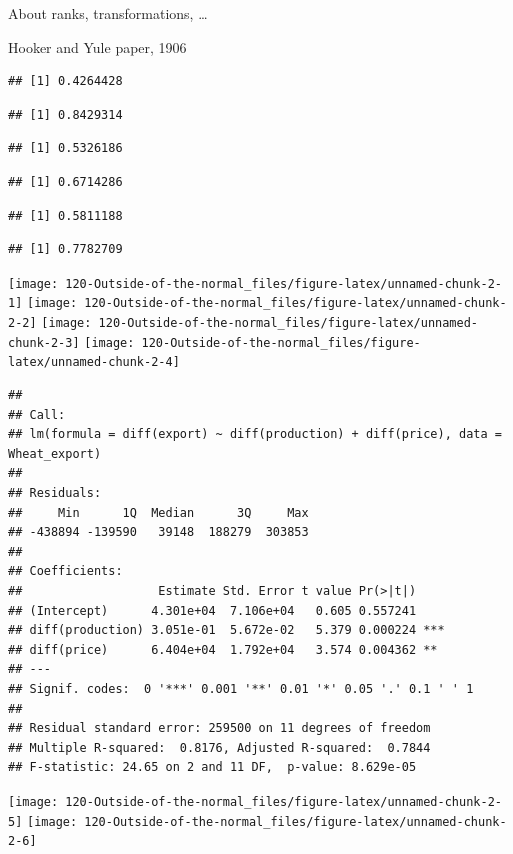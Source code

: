 \documentclass[]{tufte-book}
\begin{document}
About ranks, transformations, \ldots{}

Hooker and Yule paper, 1906

\begin{verbatim}
## [1] 0.4264428
\end{verbatim}

\begin{verbatim}
## [1] 0.8429314
\end{verbatim}

\begin{verbatim}
## [1] 0.5326186
\end{verbatim}

\begin{verbatim}
## [1] 0.6714286
\end{verbatim}

\begin{verbatim}
## [1] 0.5811188
\end{verbatim}

\begin{verbatim}
## [1] 0.7782709
\end{verbatim}

\texttt{[image: 120-Outside-of-the-normal\_files/figure-latex/unnamed-chunk-2-1]} \texttt{[image: 120-Outside-of-the-normal\_files/figure-latex/unnamed-chunk-2-2]} \texttt{[image: 120-Outside-of-the-normal\_files/figure-latex/unnamed-chunk-2-3]} \texttt{[image: 120-Outside-of-the-normal\_files/figure-latex/unnamed-chunk-2-4]}

\begin{verbatim}
## 
## Call:
## lm(formula = diff(export) ~ diff(production) + diff(price), data = Wheat_export)
## 
## Residuals:
##     Min      1Q  Median      3Q     Max 
## -438894 -139590   39148  188279  303853 
## 
## Coefficients:
##                   Estimate Std. Error t value Pr(>|t|)    
## (Intercept)      4.301e+04  7.106e+04   0.605 0.557241    
## diff(production) 3.051e-01  5.672e-02   5.379 0.000224 ***
## diff(price)      6.404e+04  1.792e+04   3.574 0.004362 ** 
## ---
## Signif. codes:  0 '***' 0.001 '**' 0.01 '*' 0.05 '.' 0.1 ' ' 1
## 
## Residual standard error: 259500 on 11 degrees of freedom
## Multiple R-squared:  0.8176, Adjusted R-squared:  0.7844 
## F-statistic: 24.65 on 2 and 11 DF,  p-value: 8.629e-05
\end{verbatim}

\texttt{[image: 120-Outside-of-the-normal\_files/figure-latex/unnamed-chunk-2-5]} \texttt{[image: 120-Outside-of-the-normal\_files/figure-latex/unnamed-chunk-2-6]}
\end{document}
